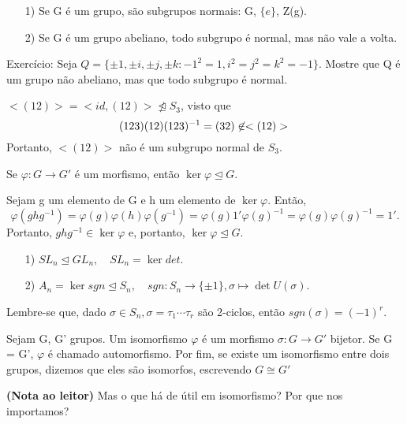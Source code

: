 \documentclass[Algebra/algebra_notes.tex]{subfiles}
\begin{document}
\begin{example*}
	\begin{itemize}
		\item[1)] Se G é um grupo, são subgrupos normais: G, $\{e\}$, Z(g).
		\item[2)] Se G é um grupo abeliano, todo subgrupo é normal, mas não vale a volta.
	\end{itemize}
\end{example*}
\begin{example*}
	Exercício: Seja $Q = \{\pm1, \pm i, \pm j, \pm k: -1^{2} = 1, i^{2} = j^{2} = k^{2} = -1\}.$ Mostre que Q é um grupo
	não abeliano, mas que todo subgrupo é normal.
\end{example*}
\begin{example*}
	$<(12)> = <id, (12)>\not\trianglelefteq{S_{3}}$, visto que
	$$
		(123)(12)(123)^{-1} = (32)\not\in <(12)>\\
	$$
	Portanto, $<(12)>$ não é um subgrupo normal de $S_{3}.$
\end{example*}
\begin{prop*}
	Se $\varphi:G\rightarrow G'$ é um morfismo, então $\ker{\varphi}\trianglelefteq{G}.$
\end{prop*}
\begin{proof*}
	Sejam g um elemento de G e h um elemento de $\ker{\varphi}$. Então,
	$$
		\varphi(ghg^{-1}) = \varphi(g)\varphi(h)\varphi(g^{-1}) = \varphi(g)1'\varphi(g)^{-1} = \varphi(g)\varphi(g)^{-1} = 1'.
	$$
	Portanto, $ghg^{-1}\in\ker{\varphi}$ e, portanto, $\ker{\varphi}\trianglelefteq{G}.$ \qedsymbol
\end{proof*}
\begin{example*}
	\begin{itemize}
		\item[1)] $SL_{n}\trianglelefteq{GL_{n}}, \quad SL_{n} = \ker{det}.$
		\item[2)] $A_{n} = \ker{sgn}\trianglelefteq{S_{n}}, \quad sgn:S_{n}\rightarrow\{\pm 1\}, \sigma\mapsto \det{U(\sigma)}.$
	\end{itemize}
\end{example*}
Lembre-se que, dado $\sigma\in S_{n}, \sigma = \tau_{1}\cdots\tau_{r}$ são 2-ciclos, então $sgn(\sigma) = (-1)^{r}.$
\begin{def*}
	Sejam G, G' grupos. Um isomorfismo $\varphi$ é um morfismo $\sigma:G\rightarrow G'$ bijetor. Se G = G', $\varphi$ é chamado automorfismo.
	Por fim, se existe um isomorfismo entre dois grupos, dizemos que eles são isomorfos, escrevendo $G\cong G'$
\end{def*}
\textbf{(Nota ao leitor)} Mas o que há de útil em isomorfismo? Por que nos importamos?
\end{document}
